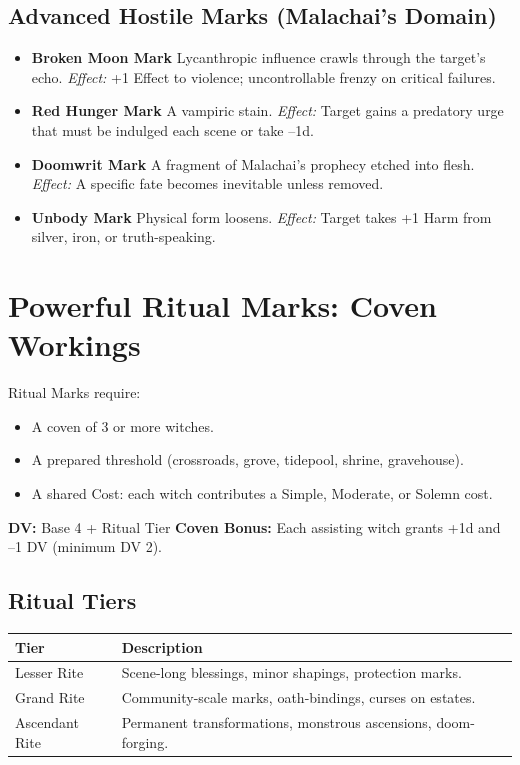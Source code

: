 \documentclass[11pt]{book}
\begin{document}
\subsection*{Advanced Hostile Marks (Malachai's Domain)}

\begin{itemize}[leftmargin=1.5em]
    \item \textbf{Broken Moon Mark}  
    Lycanthropic influence crawls through the target's echo.  
    \emph{Effect:} +1 Effect to violence; uncontrollable frenzy on critical failures.

    \item \textbf{Red Hunger Mark}  
    A vampiric stain.  
    \emph{Effect:} Target gains a predatory urge that must be indulged each scene or take --1d.

    \item \textbf{Doomwrit Mark}  
    A fragment of Malachai's prophecy etched into flesh.  
    \emph{Effect:} A specific fate becomes inevitable unless removed.

    \item \textbf{Unbody Mark}  
    Physical form loosens.  
    \emph{Effect:} Target takes +1 Harm from silver, iron, or truth-speaking.
\end{itemize}

\newpage

\section*{Powerful Ritual Marks: Coven Workings}

Ritual Marks require:
\begin{itemize}[noitemsep]
    \item A coven of 3 or more witches.
    \item A prepared threshold (crossroads, grove, tidepool, shrine, gravehouse).
    \item A shared Cost: each witch contributes a Simple, Moderate, or Solemn cost.
\end{itemize}

\textbf{DV:} Base 4 + Ritual Tier  
\textbf{Coven Bonus:} Each assisting witch grants +1d and --1 DV (minimum DV 2).

\subsection*{Ritual Tiers}

\begin{center}
\begin{longtable}{p{} p{}}
\toprule
\textbf{Tier} & \textbf{Description} \\
\midrule
Lesser Rite & Scene-long blessings, minor shapings, protection marks. \\
Grand Rite & Community-scale marks, oath-bindings, curses on estates. \\
Ascendant Rite & Permanent transformations, monstrous ascensions, doom-forging. \\
\bottomrule
\end{longtable}
\end{center}
\end{document}
